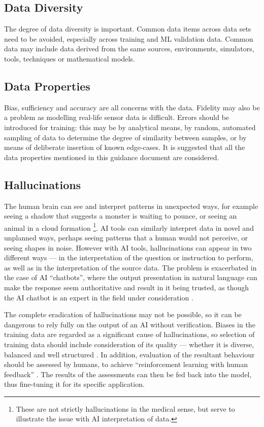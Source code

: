 \subsection{Data Diversity}
The degree of data diversity is important. Common data items across data sets need to be avoided, especially across training and
ML
validation data. Common data may include data derived from the same sources, environments, simulators, tools, techniques or mathematical models.

\subsection{Data Properties}
Bias, sufficiency and accuracy are all concerns with the data. Fidelity may also be a problem as modelling real-life sensor data is difficult.  Errors should be introduced for training: this may be by analytical means, by random, automated sampling of data to determine the degree of similarity between samples, or by means of deliberate insertion of known edge-cases. 
It is suggested that all the data properties mentioned in this guidance document are considered.

\subsection{Hallucinations}
\label{bkm:MachineLearning:Hallucinations}
%
The human brain can see and interpret patterns in unexpected ways, for example seeing a shadow that
suggests a monster is waiting to pounce, or seeing an animal in a cloud formation%
\footnote{These are not strictly hallucinations in the medical sense, but serve to illustrate
the issue with AI interpretation of data.}.
AI tools can similarly interpret data in novel and unplanned ways, perhaps seeing patterns that a
human would not perceive, or seeing shapes in noise. However with AI tools, hallucinations can appear
in two different ways --- in the interpretation of the question or instruction to perform, as well as
in the interpretation of the source data.
The problem is exacerbated in the case of AI ``chatbots'', where the output presentation in natural
language can make the response seem authoritative and result in it being trusted, as though the
AI chatbot is an expert in the field under consideration \cite{citation:chatbotsterrible:website}. 

The complete eradication of hallucinations may not be possible, so it can be dangerous to rely fully
on the output of an AI without verification. Biases in the training data are regarded as a
significant cause of hallucinations, so selection of training data should include consideration
of its quality --- whether it is diverse, balanced and well structured
\cite{citation:halucinations:website}. In addition, evaluation of the resultant behaviour should be
assessed by humans, to achieve ``reinforcement learning with human feedback''
\cite{citation:howchatgptworks:website}.
The results of the assessments can then be fed back into the model,
thus fine-tuning it for its specific application.

